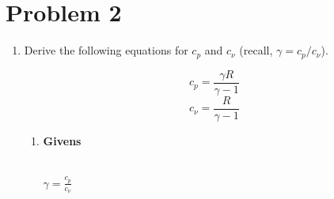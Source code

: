\documentclass[12pt,letterpaper]{article}
\begin{document}
	\newpage
	
	\section*{Problem 2}
	\label{Sec:Problem2}
	\begin{enumerate}[label=(\alph*)]
		\item Derive the following equations for $c_p$ and $c_{\nu}$ (recall, $\gamma = c_p/c_{\nu}$).
		\begin{equation*}
			c_p = \frac{\gamma R}{\gamma - 1}
		\end{equation*}
		\begin{equation*}
			c_{\nu} = \frac{R}{\gamma-1}
		\end{equation*}
		
		\begin{enumerate}[label=\arabic*.]
			\item{\textbf{Givens}}
			\\
			$\gamma = \frac{c_p}{c_{\nu}}$


\end{enumerate}
\end{enumerate}
\end{document}

